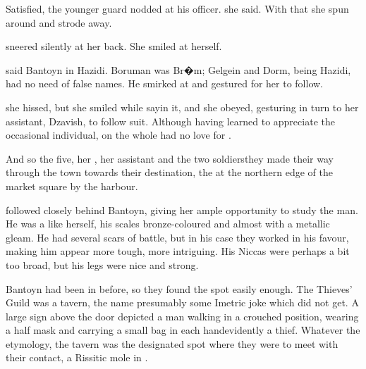Satisfied, the younger guard nodded at his officer.  she said.  With that she spun around and strode away. 

\Filgzed{} sneered silently at her back.  She smiled at herself.  

 said Bantoyn in Hazidi.  Boruman was Br�m; Gelgein and Dorm, being Hazidi, had no need of false names.  He smirked at \Filgzed{} and gestured for her to follow.  

 she hissed, but she smiled while sayin it, and she obeyed, gesturing in turn to her assistant, Dzavish, to follow suit.  Although having learned to appreciate the occasional individual, on the whole \Filgzed{} had no love for \humans{}. 

\new
And so the five\dash{}\Filgzed{}, her , her assistant and the two soldiers\dash{}they made their way through the town towards their destination, the  at the northern edge of the market square by the harbour. 

\Filgzed{} followed closely behind Bantoyn, giving her ample opportunity to study the man.  He was a \Mekrii{} \scatha{} like herself, his scales bronze-coloured and almost with a metallic gleam. He had several scars of battle, but in his case they worked in his favour, making him appear more tough, more intriguing. His Niccas were perhaps a bit too broad, but his legs were nice and strong. 

Bantoyn had been in \FendorSmall{} before, so they found the spot easily enough. The Thieves' Guild was a tavern, the name presumably some Imetric joke which \Filgzed{} did not get. A large sign above the door depicted a man walking in a crouched position, wearing a half mask and carrying a small bag in each hand\dash{}evidently a thief. Whatever the etymology, the tavern was the designated spot where they were to meet with their contact, a Rissitic mole in \FendorSmall{}. 

